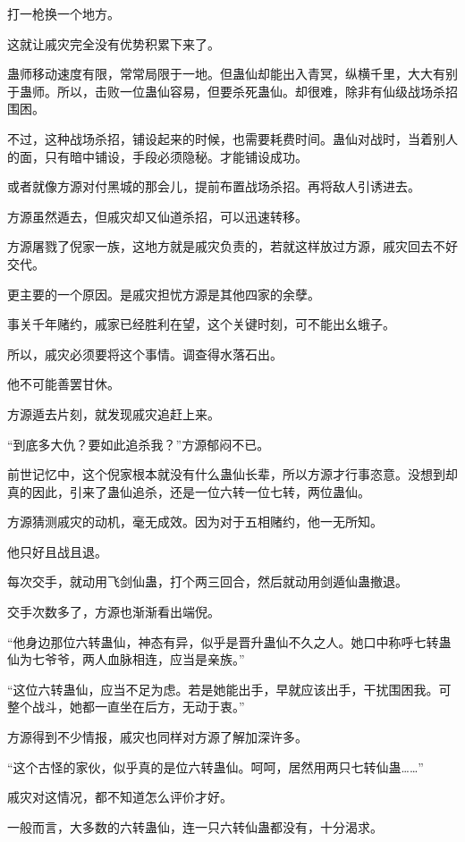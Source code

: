 \begin{this_body}
打一枪换一个地方。

这就让戚灾完全没有优势积累下来了。

蛊师移动速度有限，常常局限于一地。但蛊仙却能出入青冥，纵横千里，大大有别于蛊师。所以，击败一位蛊仙容易，但要杀死蛊仙。却很难，除非有仙级战场杀招围困。

不过，这种战场杀招，铺设起来的时候，也需要耗费时间。蛊仙对战时，当着别人的面，只有暗中铺设，手段必须隐秘。才能铺设成功。

或者就像方源对付黑城的那会儿，提前布置战场杀招。再将敌人引诱进去。

方源虽然遁去，但戚灾却又仙道杀招，可以迅速转移。

方源屠戮了倪家一族，这地方就是戚灾负责的，若就这样放过方源，戚灾回去不好交代。

更主要的一个原因。是戚灾担忧方源是其他四家的余孽。

事关千年赌约，戚家已经胜利在望，这个关键时刻，可不能出幺蛾子。

所以，戚灾必须要将这个事情。调查得水落石出。

他不可能善罢甘休。

方源遁去片刻，就发现戚灾追赶上来。

“到底多大仇？要如此追杀我？”方源郁闷不已。

前世记忆中，这个倪家根本就没有什么蛊仙长辈，所以方源才行事恣意。没想到却真的因此，引来了蛊仙追杀，还是一位六转一位七转，两位蛊仙。

方源猜测戚灾的动机，毫无成效。因为对于五相赌约，他一无所知。

他只好且战且退。

每次交手，就动用飞剑仙蛊，打个两三回合，然后就动用剑遁仙蛊撤退。

交手次数多了，方源也渐渐看出端倪。

“他身边那位六转蛊仙，神态有异，似乎是晋升蛊仙不久之人。她口中称呼七转蛊仙为七爷爷，两人血脉相连，应当是亲族。”

“这位六转蛊仙，应当不足为虑。若是她能出手，早就应该出手，干扰围困我。可整个战斗，她都一直坐在后方，无动于衷。”

方源得到不少情报，戚灾也同样对方源了解加深许多。

“这个古怪的家伙，似乎真的是位六转蛊仙。呵呵，居然用两只七转仙蛊……”

戚灾对这情况，都不知道怎么评价才好。

一般而言，大多数的六转蛊仙，连一只六转仙蛊都没有，十分渴求。


\end{this_body}
